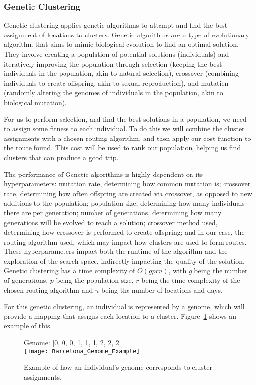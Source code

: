 \subsubsection{Genetic Clustering}
Genetic clustering applies genetic algorithms to attempt and find the best assignment of locations to clusters.
Genetic algorithms are a type of evolutionary algorithm that aims to mimic biological evolution to find an optimal
solution.
They involve creating a population of potential solutions (individuals) and iteratively improving the population
through selection (keeping the best individuals in the population, akin to natural selection), crossover (combining
individuals to create offspring, akin to sexual reproduction), and mutation (randomly altering the genomes
of individuals in the population, akin to biological mutation).

For us to perform selection, and find the best solutions in a population, we need to assign some fitness to each
individual.
To do this we will combine the cluster assignments with a chosen routing algorithm, and then apply our cost function
to the route found.
This cost will be used to rank our population, helping us find clusters that can produce a good trip.

The performance of Genetic algorithms is highly dependent on its hyperparameters: mutation rate, determining how
common mutation is; crossover rate, determining how often offspring are created via crossover, as opposed to new
additions to the population; population size, determining how many individuals there are per generation; number of
generations, determining how many generations will be evolved to reach a solution; crossover method used,
determining how crossover is performed to create offspring; and in our case, the routing algorithm used, which may
impact how clusters are used to form routes.
These hyperparameters impact both the runtime of the algorithm and the exploration of the search space, indirectly
impacting the quality of the solution.
Genetic clustering has a time complexity of $O(g p r n)$, with $g$ being the number of generations, $p$ being the
population size, $r$ being the time complexity of the chosen routing algorithm and $n$ being the number of locations
and days.\\

\noindent
For this genetic clustering, an individual is represented by a genome, which will provide a mapping that assigns each
location to a cluster.
Figure~\ref{fig:barcelona-genome-example} shows an example of this.
\begin{figure}[H]
    \centering
    Genome: [0, 0, 0, 1, 1, 1, 2, 2, 2]\\
    \texttt{[image: Barcelona\_Genome\_Example]}
    \caption{Example of how an individual's genome corresponds to cluster assignments.}
    \label{fig:barcelona-genome-example}
\end{figure}

